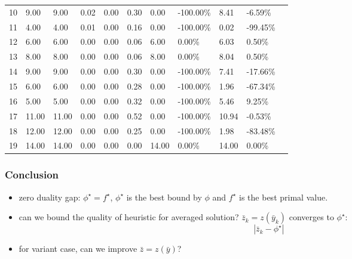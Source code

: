 \begin{frame}
\begin{tabular}{lllrrrlllll}
    10 & 9.00                 & 9.00                   & 0.02                    & 0.00                                        & 0.30 & 0.00  & -100.00\% & 8.41  & -6.59\%   \\
    11 & 4.00                 & 4.00                   & 0.01                    & 0.00                                        & 0.16 & 0.00  & -100.00\% & 0.02  & -99.45\%  \\
    12 & 6.00                 & 6.00                   & 0.00                    & 0.00                                        & 0.06 & 6.00  & 0.00\%    & 6.03  & 0.50\%    \\
    13 & 8.00                 & 8.00                   & 0.00                    & 0.00                                        & 0.06 & 8.00  & 0.00\%    & 8.04  & 0.50\%    \\
    14 & 9.00                 & 9.00                   & 0.00                    & 0.00                                        & 0.30 & 0.00  & -100.00\% & 7.41  & -17.66\%  \\
    15 & 6.00                 & 6.00                   & 0.00                    & 0.00                                        & 0.28 & 0.00  & -100.00\% & 1.96  & -67.34\%  \\
    16 & 5.00                 & 5.00                   & 0.00                    & 0.00                                        & 0.32 & 0.00  & -100.00\% & 5.46  & 9.25\%    \\
    17 & 11.00                & 11.00                  & 0.00                    & 0.00                                        & 0.52 & 0.00  & -100.00\% & 10.94 & -0.53\%   \\
    18 & 12.00                & 12.00                  & 0.00                    & 0.00                                        & 0.25 & 0.00  & -100.00\% & 1.98  & -83.48\%  \\
    19 & 14.00                & 14.00                  & 0.00                    & 0.00                                        & 0.00 & 14.00 & 0.00\%    & 14.00 & 0.00\%    \\
  \end{tabular}
  \normalsize
\end{frame}
\begin{frame}
  \frametitle{Conclusion}

  \begin{itemize}
    \item zero duality gap: \(\phi^\star = f^\star\), \(\phi^\star\) is the best bound by \(\phi\) and \( f^\star\) is the best primal value.
    \item can we bound the quality of heuristic for averaged solution? \(\bar z_k = z(\bar y_k)\) converges to \(\phi^\star\):
          \[|\bar z_k - \phi^\star| \]
    \item for variant case, can we improve \(\bar z = z(\bar y)\)?
  \end{itemize}
\end{frame}



